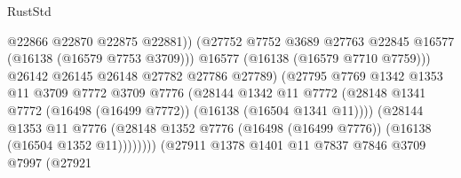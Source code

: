\begin{lexlean}{RustStd}
\begin{coremodule}
                                            @22866
                                            @22870
                                            @22875
                                            @22881))
                                        (@27752
                                          @7752
                                          @3689
                                          @27763
                                          @22845
                                          @16577
                                          (@16138 (@16579 @7753 @3709)))
                                        @16577
                                        (@16138 (@16579 @7710 @7759)))
                                      @26142
                                      @26145
                                      @26148
                                      @27782
                                      @27786
                                      @27789)
                                    (@27795
                                      @7769
                                      @1342
                                      @1353
                                      @11
                                      @3709
                                      @7772
                                      @3709
                                      @7776
                                      (@28144
                                        @1342
                                        @11
                                        @7772
                                        (@28148
                                          @1341
                                          @7772
                                          (@16498 (@16499 @7772))
                                          (@16138 (@16504 @1341 @11))))
                                      (@28144
                                        @1353
                                        @11
                                        @7776
                                        (@28148
                                          @1352
                                          @7776
                                          (@16498 (@16499 @7776))
                                          (@16138 (@16504 @1352 @11))))))))
                              (@27911
                                @1378
                                @1401
                                @11
                                @7837
                                @7846
                                @3709
                                @7997
                                (@27921

\end{coremodule}
\end{lexlean}
